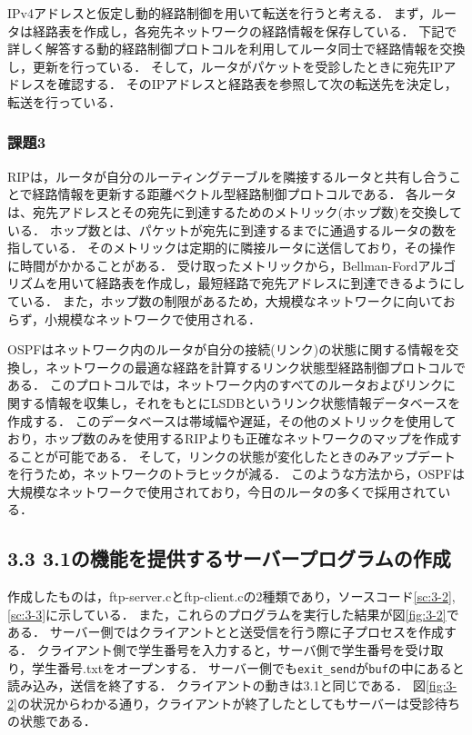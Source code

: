 \documentclass[documentclass]{jsarticle}
\begin{document}
IPv4アドレスと仮定し動的経路制御を用いて転送を行うと考える．
まず，ルータは経路表を作成し，各宛先ネットワークの経路情報を保存している．
下記で詳しく解答する動的経路制御プロトコルを利用してルータ同士で経路情報を交換し，更新を行っている．
そして，ルータがパケットを受診したときに宛先IPアドレスを確認する．
そのIPアドレスと経路表を参照して次の転送先を決定し，転送を行っている．

\subsubsection*{課題3}
RIPは，ルータが自分のルーティングテーブルを隣接するルータと共有し合うことで経路情報を更新する距離ベクトル型経路制御プロトコルである．
各ルータは、宛先アドレスとその宛先に到達するためのメトリック(ホップ数)を交換している．
ホップ数とは、パケットが宛先に到達するまでに通過するルータの数を指している．
そのメトリックは定期的に隣接ルータに送信しており，その操作に時間がかかることがある．
受け取ったメトリックから，Bellman-Fordアルゴリズムを用いて経路表を作成し，最短経路で宛先アドレスに到達できるようにしている．
また，ホップ数の制限があるため，大規模なネットワークに向いておらず，小規模なネットワークで使用される．

OSPFはネットワーク内のルータが自分の接続(リンク)の状態に関する情報を交換し，ネットワークの最適な経路を計算するリンク状態型経路制御プロトコルである．
このプロトコルでは，ネットワーク内のすべてのルータおよびリンクに関する情報を収集し，それをもとにLSDBというリンク状態情報データベースを作成する．
このデータベースは帯域幅や遅延，その他のメトリックを使用しており，ホップ数のみを使用するRIPよりも正確なネットワークのマップを作成することが可能である．
そして，リンクの状態が変化したときのみアップデートを行うため，ネットワークのトラヒックが減る．
このような方法から，OSPFは大規模なネットワークで使用されており，今日のルータの多くで採用されている．



\subsection*{3.3 3.1の機能を提供するサーバープログラムの作成}
作成したものは，ftp-server.cとftp-client.cの2種類であり，ソースコード\ref*{sc:3-2},\ref*{sc:3-3}に示している．
また，これらのプログラムを実行した結果が図\ref*{fig:3-2}である．
サーバー側ではクライアントとと送受信を行う際に子プロセスを作成する．
クライアント側で学生番号を入力すると，サーバ側で学生番号を受け取り，学生番号.txtをオープンする．
サーバー側でも\texttt{exit\_send}が\texttt{buf}の中にあると読み込み，送信を終了する．
クライアントの動きは3.1と同じである．
図\ref*{fig:3-2}の状況からわかる通り，クライアントが終了したとしてもサーバーは受診待ちの状態である．
\end{document}
